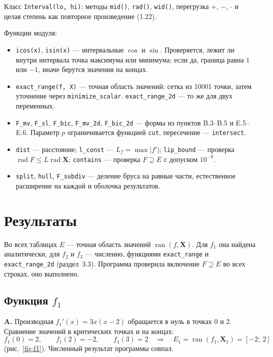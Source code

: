 \documentclass[a4paper, 14pt]{extarticle}
\begin{document}
Класс \texttt{Interval(lo, hi)}: методы \texttt{mid()}, \texttt{rad()}, \texttt{wid()}, перегрузка $+$, $-$, $\cdot$ и целая степень как повторное произведение (1.22).

Функции модуля:
\begin{itemize}
    \item \texttt{icos(x)}, \texttt{isin(x)} --- интервальные $\cos$ и $\sin$. Проверяется, лежит ли внутри интервала точка максимума или минимума; если да, граница равна $1$ или $-1$, иначе берутся значения на концах.
    \item \texttt{exact\_range(f, X)} --- точная область значений: сетка из 10001 точки, затем уточнение через \texttt{minimize\_scalar}. \texttt{exact\_range\_2d} --- то же для двух переменных.
    \item \texttt{F\_mv}, \texttt{F\_sl}, \texttt{F\_bic}, \texttt{F\_mv\_2d}, \texttt{F\_bic\_2d} --- формы из пунктов B.3--B.5 и E.5--E.6. Параметр $p$ ограничивается функцией \texttt{cut}, пересечение --- \texttt{intersect}.
    \item \texttt{dist} --- расстояние; \texttt{l\_const} --- $L_f = \max|f'|$; \texttt{lip\_bound} --- проверка $\operatorname{rad}F \le L\operatorname{rad}\mathbf{X}$; \texttt{contains} --- проверка $F \supseteq E$ с допуском $10^{-9}$.
    \item \texttt{split}, \texttt{hull}, \texttt{F\_subdiv} --- деление бруса на равные части, естественное расширение на каждой и оболочка результатов.
\end{itemize}


\section{Результаты}

Во всех таблицах $E$ --- точная область значений $\operatorname{ran}(f,\mathbf{X})$. Для $f_1$ она найдена аналитически, для $f_2$ и $f_3$ --- численно, функциями \texttt{exact\_range} и \texttt{exact\_range\_2d} (раздел~3.3). Программа проверила включение $F \supseteq E$ во всех строках, оно выполнено.

\subsection{Функция $f_1$}

\textbf{A.} Производная $f_1'(x) = 3x(x-2)$ обращается в нуль в точках $0$ и $2$. Сравнение значений в критических точках и на концах:
\begin{equation*}
    f_1(0) = 2,\qquad f_1(2) = -2,\qquad f_1(3) = 2
    \quad\Rightarrow\quad E_1 = \operatorname{ran}(f_1, \mathbf{X}_1) = [-2;\ 2]
\end{equation*}
(рис.~\ref{fig:f1}). Численный результат программы совпал.
\end{document}
